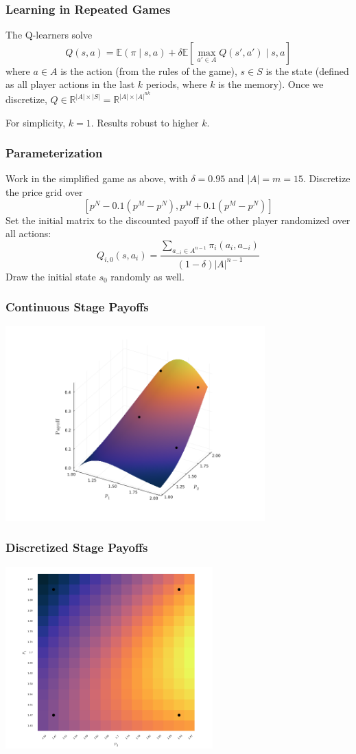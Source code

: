 \documentclass{beamer}
\begin{document}
\begin{frame}\frametitle{Learning in Repeated Games}
	The Q-learners solve \[Q(s,a) = \mathbb{E}(\pi \mid s,a) + \delta \mathbb{E}\left[ \max_{a'\in A} Q(s',a') \mid s,a\right]\] where $a \in A$ is the action (from the rules of the game), $s \in S$ is the state (defined as all player actions in the last $k$ periods, where $k$ is the memory). Once we discretize, $Q \in \mathbb{R}^{|A| \times |S|} = \mathbb{R}^{|A| \times |A|^{nk}}$
	
	For simplicity, $k=1$. Results robust to higher $k$.
\end{frame}

\begin{frame}\frametitle{Parameterization}
	Work in the simplified game as above, with $\delta = 0.95$ and $|A| = m = 15$. Discretize the price grid over \[\left[p^N - 0.1(p^M - p^N), p^M + 0.1(p^M - p^N)\right]\] Set the initial matrix to the discounted payoff if the other player randomized over all actions: \[Q_{i,0}(s,a_i) = \frac{\sum_{a_{-i} \in A^{n-1}}\pi_i(a_i,a_{-i})}{(1-\delta) |A|^{n-1}}\]Draw the initial state $s_0$ randomly as well.
\end{frame}

\begin{frame}\frametitle{Continuous Stage Payoffs}
\centering
	\includegraphics[width=10cm]{cont_plot.png}
\end{frame}
\begin{frame}\frametitle{Discretized Stage Payoffs}
\centering
	\includegraphics[width=8cm]{heatmap_plot.png}
\end{frame}
\end{document}
